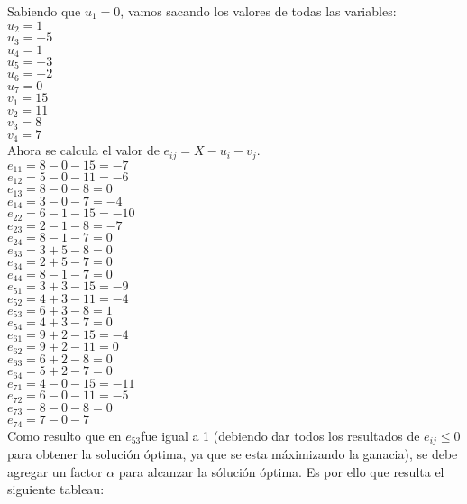 \documentclass[12pt,letterpaper]{article}
\begin{document}
Sabiendo que $u_{1}=0$, vamos sacando los valores de todas las variables: \\

$u_{2}=1$ \\
$u_{3}=-5$ \\
$u_{4}=1$ \\
$u_{5}=-3$ \\
$u_{6}=-2$ \\
$u_{7}=0$ \\
$v_{1}=15$ \\
$v_{2}=11$ \\
$v_{3}=8$ \\
$v_{4}=7$ \\

Ahora se calcula el valor de $e_{ij}=X-u_{i}-v_{j}$. \\

$e_{11}=8-0-15=-7$ \\
$e_{12}=5-0-11=-6$ \\
$e_{13}=8-0-8= 0$\\
$e_{14}=3-0-7=-4$ \\
$e_{22}=6-1-15=-10$ \\
$e_{23}=2-1-8=-7$ \\
$e_{24}=8-1-7=0$ \\
$e_{33}=3+5-8=0$ \\
$e_{34}=2+5-7=0$ \\
$e_{44}=8-1-7=0$ \\
$e_{51}=3+3-15=-9$ \\
$e_{52}=4+3-11=-4$ \\
$e_{53}=6+3-8=1$ \\
$e_{54}=4+3-7=0$ \\
$e_{61}=9+2-15=-4$ \\
$e_{62}=9+2-11=0$ \\
$e_{63}=6+2-8=0$ \\
$e_{64}=5+2-7=0$ \\
$e_{71}=4-0-15=-11$ \\
$e_{72}=6-0-11=-5$ \\
$e_{73}=8-0-8=0$ \\
$e_{74}=7-0-7$ \\

Como resulto que en $e_{53}$fue igual a 1 (debiendo dar todos los resultados de $e_{ij}\leq0$ para obtener la solución óptima, ya que se esta máximizando la ganacia),
se debe agregar un factor $\alpha$ para alcanzar la sólución óptima. Es por ello que resulta el siguiente tableau: 
\newline
\end{document}

